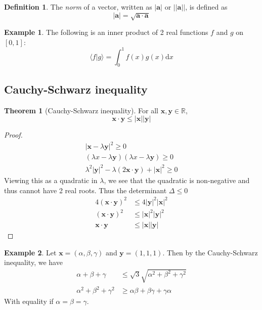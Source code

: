 \documentclass[a4paper]{article}
\theoremstyle{definition}
\newtheorem*{thm}{Theorem}
\newtheorem*{defi}{Definition}
\newtheorem*{eg}{Example}
\newcommand{\mb}[1]{\mathbf{#1}}
\newcommand{\bra}{\langle}
\newcommand{\ket}{\rangle}
\newcommand{\R}{\mathbb{R}}
\renewcommand{\d}{\mathrm{d}}
\begin{document}
\begin{defi}
  The \emph{norm} of a vector, written as $|\mb{a}|$ or $||\mb{a}||$, is defined as
  \[
  |\mb{a}| = \sqrt{\mb{a\cdot a}}
  \]
\end{defi}

\begin{eg}
  The following is an inner product of 2 real functions $f$ and $g$ on $[0, 1]$:
  \[
  \bra f|g\ket = \int_0^1f(x)g(x)\d x
  \]
\end{eg}

\subsection{Cauchy-Schwarz inequality}
\begin{thm}[Cauchy-Schwarz inequality]
  For all $\mb{x, y}\in \R$,
  \[
  \mb{x\cdot y \leq |x||y|}
  \]
\end{thm}

\begin{proof}
  \begin{align*}
    |\mb{x} - \lambda\mb{y}|^2 \geq 0\\
    (\lambda{x} - \lambda\mb{y})(\lambda{x} - \lambda\mb{y}) \geq 0\\
    \lambda^2 |\mb{y}|^2 - \lambda (2\mb{x\cdot y}) + |\mb{x}|^2 \geq 0
  \end{align*}
  Viewing this as a quadratic in $\lambda$, we see that the quadratic is non-negative and thus cannot have 2 real roots. Thus the determinant $\Delta \leq 0$
  \begin{align*}
    4(\mb{x\cdot y})^2 &\leq 4|\mb{y}|^2|\mb{x}|^2\\
    (\mb{x\cdot y})^2 &\leq |\mb{x}|^2|\mb{y}|^2\\
    \mb{x\cdot y} &\leq \mb{|x||y|}
  \end{align*}
\end{proof}

\begin{eg}
  Let $\mb{x} = (\alpha, \beta, \gamma)$ and $\mb{y} = (1, 1, 1)$. Then by the Cauchy-Schwarz inequality, we have
  \begin{align*}
    \alpha + \beta + \gamma &\leq \sqrt{3}\sqrt{\alpha^2 + \beta^2 + \gamma^2}\\
    \alpha^2 + \beta^2 + \gamma^2 &\geq \alpha\beta + \beta\gamma + \gamma\alpha
  \end{align*}
  With equality if $\alpha = \beta = \gamma$.
\end{eg}
\end{document}
